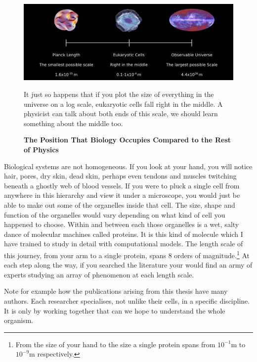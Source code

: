 \begin{figure}
	\begin{center}
		\includegraphics[width=1.0\textwidth]{figures/scales.png}
	\end{center}
	\captionsetup{singlelinecheck = false, justification=raggedright}
	\caption[The Position That Biology Occupies Compared to the Rest of Physics] {\textbf{The Position That Biology Occupies Compared to the Rest of Physics}}{It just so happens that if you plot the size of everything  in the universe on a log scale, eukaryotic cells fall right in the middle. A physicist can talk about both ends of this scale, we should learn something about the middle too.}
	\label{length_scales}
\end{figure}

Biological systems are not homogeneous. If you look at your hand, you will notice hair, pores, dry skin, dead skin, perhaps even tendons and muscles twitching beneath a ghostly web of blood vessels. If you were to pluck a single cell from anywhere in this hierarchy and view it under a microscope, you would just be able to make out some of the organelles inside that cell. The size, shape and function of the organelles would vary depending on what kind of cell you happened to choose. Within and between each those organelles is a wet, salty dance of molecular machines called proteins. It is this kind of molecule which I have trained to study in detail with computational models. The length scale of this journey, from your arm to a single protein, spans 8 orders of magnitude.\footnote{ From the size of your hand to the size a single protein spans from $10^{-1}$m  to $10^{-9}$m respectively.} At each step along the way, if you searched the literature your would find an army of experts studying an array of phenomenon at each length scale. 

Note for example how the publications arising from this thesis have many authors. Each researcher specialises, not unlike their cells, in a specific discipline. It is only by working together that can we hope to understand the whole organism.

